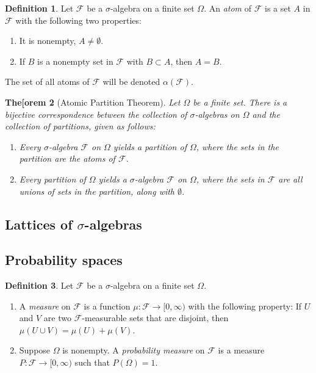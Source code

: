 \documentclass[11pt]{book}
\newtheorem{thm}{The[orem}[section]
\theoremstyle{definition}
\newtheorem{defn}[thm]{Definition}
\numberwithin{equation}{section}
\begin{document}
\begin{defn}
	Let $\mathcal{F}$ be a $\sigma$-algebra on a finite set $\Omega$. An \textit{atom} of $\mathcal{F}$ is a set $A$ in $\mathcal{F}$ with the following two properties:
	\begin{enumerate}
		\item It is nonempty, $A\neq \emptyset$.
		\item If $B$ is a nonempty set in $\mathcal{F}$ with $B\subset A$, then $A=B$.
	\end{enumerate}
	The set of all atoms of $\mathcal{F}$ will be denoted $\alpha(\mathcal{F})$.
\end{defn}

\begin{thm}[Atomic Partition Theorem]
	Let $\Omega$ be a finite set. There is a bijective correspondence between the collection of $\sigma$-algebras on $\Omega$ and the collection of partitions, given as follows:
	\begin{enumerate}
		\item Every $\sigma$-algebra $\mathcal{F}$ on $\Omega$ yields a partition of $\Omega$, where the sets in the partition are the atoms of $\mathcal{F}$.
		\item Every partition of $\Omega$ yields a $\sigma$-algebra $\mathcal{F}$ on $\Omega$, where the sets in $\mathcal{F}$ are all unions of sets in the partition, along with $\emptyset$.
	\end{enumerate}
\end{thm}

\subsection{\texorpdfstring{Lattices of $\sigma$-algebras}{Lattices of sigma-algebras}}

\subsection{Probability spaces}

\begin{defn}
	Let $\mathcal{F}$ be a $\sigma$-algebra on a finite set $\Omega$.
	\begin{enumerate}
		\item A \textit{measure} on $\mathcal{F}$ is a function $\mu:\mathcal{F} \to [0,\infty)$ with the following property: If $U$ and $V$ are two $\mathcal{F}$-measurable sets that are disjoint, then $\mu(U\cup V) = \mu(U) + \mu(V)$.
		\item Suppose $\Omega$ is nonempty. A \textit{probability measure} on $\mathcal{F}$ is a measure $P: \mathcal{F} \to [0,\infty)$ such that $P(\Omega)=1$.
	\end{enumerate}
\end{defn}
\end{document}
